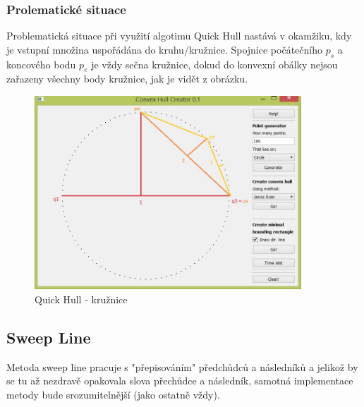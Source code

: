\documentclass[a4paper, 12pt]{article}
\begin{document}
\subsubsection{Prolematické situace}
Problematická situace při využití algotimu Quick Hull nastává v okamžiku, kdy je vstupní množina uspořádána do kruhu/kružnice. Spojnice počátečního $p_s$ a koncového bodu $p_e$ je vždy sečna kružnice, dokud do konvexní obálky nejsou zařazeny všechny body kružnice, jak je vidět z obrázku.

\begin{figure}[h]
	\centering
	\includegraphics[width=10cm]{circle.jpg}
	\caption{Quick Hull - kružnice}
\end{figure}
\clearpage

\clearpage
\subsection{Sweep Line}
Metoda sweep line pracuje s "přepisováním" předchůdců a  následníků a jelikož by se tu až nezdravě opakovala slova přechůdce a následník, samotná implementace metody bude srozumitelnější (jako ostatně vždy).
\end{document}
